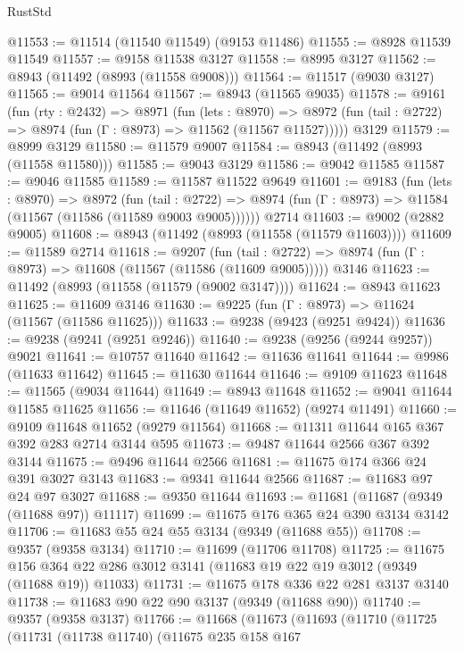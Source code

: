 \begin{lexlean}{RustStd}
\begin{coremodule}
@11553 := @11514 (@11540 @11549) (@9153 @11486)
@11555 := @8928 @11539 @11549
@11557 := @9158 @11538 @3127
@11558 := @8995 @3127
@11562 := @8943 (@11492 (@8993 (@11558 @9008)))
@11564 := @11517 (@9030 @3127)
@11565 := @9014 @11564
@11567 := @8943 (@11565 @9035)
@11578 := @9161
    (fun (rty : @2432) =>
    @8971
      (fun (lets : @8970) =>
      @8972 (fun (tail : @2722) => @8974 (fun (Γ : @8973) => @11562 (@11567 @11527)))))
    @3129
@11579 := @8999 @3129
@11580 := @11579 @9007
@11584 := @8943 (@11492 (@8993 (@11558 @11580)))
@11585 := @9043 @3129
@11586 := @9042 @11585
@11587 := @9046 @11585
@11589 := @11587 @11522 @9649
@11601 := @9183
    (fun (lets : @8970) =>
    @8972
      (fun (tail : @2722) =>
      @8974 (fun (Γ : @8973) => @11584 (@11567 (@11586 (@11589 @9003 @9005))))))
    @2714
@11603 := @9002 (@2882 @9005)
@11608 := @8943 (@11492 (@8993 (@11558 (@11579 @11603))))
@11609 := @11589 @2714
@11618 := @9207
    (fun (tail : @2722) => @8974 (fun (Γ : @8973) => @11608 (@11567 (@11586 (@11609 @9005)))))
    @3146
@11623 := @11492 (@8993 (@11558 (@11579 (@9002 @3147))))
@11624 := @8943 @11623
@11625 := @11609 @3146
@11630 := @9225 (fun (Γ : @8973) => @11624 (@11567 (@11586 @11625)))
@11633 := @9238 (@9423 (@9251 @9424))
@11636 := @9238 (@9241 (@9251 @9246))
@11640 := @9238 (@9256 (@9244 @9257)) @9021
@11641 := @10757 @11640
@11642 := @11636 @11641
@11644 := @9986 (@11633 @11642)
@11645 := @11630 @11644
@11646 := @9109 @11623
@11648 := @11565 (@9034 @11644)
@11649 := @8943 @11648
@11652 := @9041 @11644 @11585 @11625
@11656 := @11646 (@11649 @11652) (@9274 @11491)
@11660 := @9109 @11648 @11652 (@9279 @11564)
@11668 := @11311 @11644 @165 @367 @392 @283 @2714 @3144 @595
@11673 := @9487 @11644 @2566 @367 @392 @3144
@11675 := @9496 @11644 @2566
@11681 := @11675 @174 @366 @24 @391 @3027 @3143
@11683 := @9341 @11644 @2566
@11687 := @11683 @97 @24 @97 @3027
@11688 := @9350 @11644
@11693 := @11681 (@11687 (@9349 (@11688 @97)) @11117)
@11699 := @11675 @176 @365 @24 @390 @3134 @3142
@11706 := @11683 @55 @24 @55 @3134 (@9349 (@11688 @55))
@11708 := @9357 (@9358 @3134)
@11710 := @11699 (@11706 @11708)
@11725 := @11675
    @156
    @364
    @22
    @286
    @3012
    @3141
    (@11683 @19 @22 @19 @3012 (@9349 (@11688 @19)) @11033)
@11731 := @11675 @178 @336 @22 @281 @3137 @3140
@11738 := @11683 @90 @22 @90 @3137 (@9349 (@11688 @90))
@11740 := @9357 (@9358 @3137)
@11766 := @11668
    (@11673
      (@11693
        (@11710
          (@11725
            (@11731
              (@11738 @11740)
              (@11675
                @235
                @158
                @167

\end{coremodule}
\end{lexlean}

